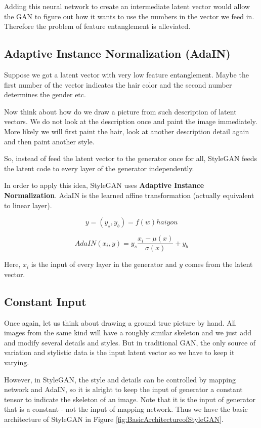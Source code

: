 \documentclass{article} %
\begin{document}
Adding this neural network to create an intermediate latent vector would allow the GAN to figure out how it wants to use the numbers in the vector we feed in. Therefore the problem of feature entanglement is alleviated.

\subsection{Adaptive Instance Normalization (AdaIN)}

Suppose we got a latent vector with very low feature entanglement. Maybe the first number of the vector indicates the hair color and the second number determines the gender etc. 

Now think about how do we draw a picture from such description of latent vectors. We do not look at the description once and paint the image immediately. More likely we will first paint the hair, look at another description detail again and then paint another style. 

So, instead of feed the latent vector to the generator once for all, StyleGAN feeds the latent code to every layer of the generator independently.

In order to apply this idea, StyleGAN uses \textbf{Adaptive Instance Normalization}. AdaIN is the learned affine transformation (actually equivalent to linear layer).

\begin{equation}
    y = (y_s, y_b) = f(w)haiyou
\end{equation}

\begin{equation}
    AdaIN(x_i, y)=y_s \frac{x_i - \mu (x)}{\sigma(x)} +y_b
\end{equation}

Here, $x_i$ is the input of every layer in the generator and $y$ comes from the latent vector.

\subsection{Constant Input}

Once again, let us think about drawing a ground true picture by hand. All images from the same kind will have a roughly similar skeleton and we just add and modify several details and styles. But in traditional GAN, the only source of variation and stylistic data is the input latent vector so we have to keep it varying. 

However, in StyleGAN, the style and details can be controlled by mapping network and AdaIN, so it is alright to keep the input of generator a constant tensor to indicate the skeleton of an image. Note that it is the input of generator that is a constant - not the input of mapping network. Thus we have the basic architecture of StyleGAN in Figure \ref{fig:BasicArchitectureofStyleGAN}.
\end{document}

